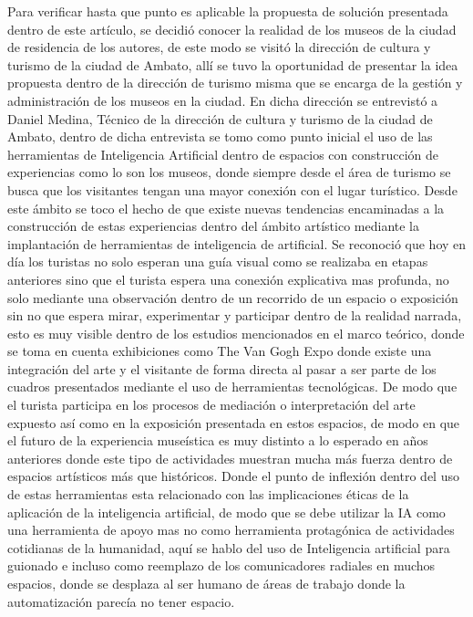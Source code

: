 \documentclass[pdflatex,sn-mathphys-num]{sn-jnl}%
\theoremstyle{thmstyleone}%
\theoremstyle{thmstyletwo}%
\theoremstyle{thmstylethree}%
\begin{document}
Para verificar hasta que punto es aplicable la propuesta de solución presentada dentro de este artículo, se decidió conocer la realidad de los museos de la ciudad de residencia de los autores, de este modo se visitó la dirección de cultura y turismo de la ciudad de Ambato, allí se tuvo la oportunidad de presentar la idea propuesta dentro de la dirección de turismo misma que se encarga de la gestión y administración de los museos en la ciudad.
En dicha dirección se entrevistó a Daniel Medina, Técnico de la dirección de cultura y turismo de la ciudad de Ambato, dentro de dicha entrevista se tomo como punto inicial el uso de las herramientas de Inteligencia Artificial dentro de espacios con construcción de experiencias como lo son los museos, donde siempre desde el área de turismo se busca que los visitantes tengan una mayor conexión con el lugar turístico. Desde este ámbito se toco el hecho de que existe nuevas tendencias encaminadas a la construcción de estas experiencias dentro del ámbito artístico mediante la implantación de herramientas de inteligencia de artificial.
Se reconoció que hoy en día los turistas no solo esperan una guía visual como se realizaba en etapas anteriores sino que el turista espera una conexión explicativa mas profunda, no solo mediante una observación dentro de un recorrido de un espacio o exposición sin no que espera mirar, experimentar y participar dentro de la realidad narrada, esto es muy visible dentro de los estudios mencionados en el marco teórico, donde se toma en cuenta exhibiciones como The Van Gogh Expo donde existe una integración del arte y el visitante de forma directa al pasar a ser parte de los cuadros presentados mediante el uso de herramientas tecnológicas.
De modo que el turista participa en los procesos de mediación o interpretación del arte expuesto así como en la exposición presentada en estos espacios, de modo en que el futuro de la experiencia museística es muy distinto a lo esperado en años anteriores donde este tipo de actividades muestran mucha más fuerza dentro de espacios artísticos más que históricos.
Donde el punto de inflexión dentro del uso de estas herramientas esta relacionado con las implicaciones éticas de la aplicación de la inteligencia artificial, de modo que se debe utilizar la IA como una herramienta de apoyo mas no como herramienta protagónica de actividades cotidianas de la humanidad, aquí se hablo del uso de Inteligencia artificial para guionado e incluso como reemplazo de los comunicadores radiales en muchos espacios, donde se desplaza al ser humano de áreas de trabajo donde la automatización parecía no tener espacio.
\end{document}
